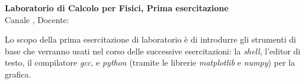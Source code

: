 \documentclass[11pt]{article}
\begin{document}
\pagestyle{empty}

\begin{center}
{\Large \bf  Laboratorio di Calcolo per Fisici, Prima esercitazione\\[2mm]}
{\large Canale \canale, Docente: \docente}
\end{center}
\vspace{4mm}

\begin{mdframed}[backgroundcolor=panna]
  Lo scopo della prima esercitazione di laboratorio \`e di introdurre gli strumenti di base che verranno usati nel corso delle successive esercitazioni:
  la {\em shell}, l'editor di testo, il compilatore {\em gcc}, e {\em python\/} (tramite le librerie
  {\em matplotlib\/} e {\em numpy\/}) per la grafica.
\\
\end{mdframed}
%
%
\end{document}
